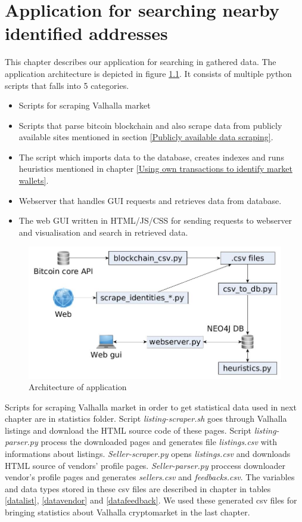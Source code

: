 \documentclass[
  digital, %
  table,   %
  lof,     %
  lot,     %
  oneside
]{fithesis3}
\begin{document}
\chapter{Application for searching nearby identified addresses}

This chapter describes our application for searching in gathered data.
The application architecture is depicted in figure \ref{application_architecture}.
It consists of multiple python scripts that falls into 5 categories.

\begin{itemize}
 \item Scripts for scraping Valhalla market
 \item Scripts that parse bitcoin blockchain and also scrape data from publicly available sites mentioned in section \ref{Publicly available data scraping}.
 \item The script which imports data to the database, creates indexes and runs heuristics mentioned in chapter \ref{Using own transactions to identify market wallets}.
 \item Webserver that handles GUI requests and retrieves data from database.
 \item The web GUI written in HTML/JS/CSS for sending requests to webserver and visualisation and search in retrieved data. 
\end{itemize}


\begin{figure}[!htb]
    \centering
    \includegraphics[width=1\textwidth]{application_architecture}
    \caption{Architecture of application}
    \label{application_architecture}
\end{figure}

Scripts for scraping Valhalla market in order to get statistical data used in next chapter are in statistics folder.
Script \emph{listing-scraper.sh} goes through Valhalla listings and download the HTML source code of these pages.
Script \emph{listing-parser.py} process the downloaded pages and generates file \emph{listings.csv} with informations about listings.
\emph{Seller-scraper.py} opens \emph{listings.csv} and downloads HTML source of vendors' profile pages. 
\emph{Seller-parser.py} proccess downloader vendor's profile pages and generates \emph{sellers.csv} and \emph{feedbacks.csv}.
The variables and data types stored in these csv files are described in chapter \label{Valhalla cryptomarket webscraping}
in tables \ref{datalist}, \ref{datavendor} and \ref{datafeedback}. We used these generated csv files for
bringing statistics about Valhalla cryptomarket in the last chapter.
\end{document}
